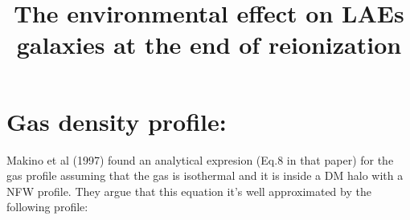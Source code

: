 \documentclass[12pt]{article}
\title{\begin{LARGE}
{The environmental effect on LAEs galaxies at the end of reionization}
\end{LARGE}}
\begin{document}
\maketitle




\section{Gas density profile:}\label{sec:rho}

Makino et al (1997) found an analytical expresion (Eq.8 in that paper) for the gas profile assuming that the gas
is isothermal and it is inside a DM halo with a NFW profile. They argue that this equation it's well approximated by
the following profile:
\end{document}
